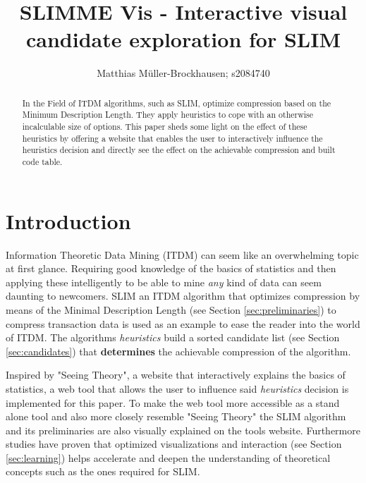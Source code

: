\documentclass[runningheads]{llncs}
\begin{document}
%


\title{SLIMME Vis - Interactive visual candidate exploration for SLIM}
%
%
\author{Matthias Müller-Brockhausen; s2084740}
%
%
%
\maketitle              %
%
\begin{abstract}
In the Field of ITDM algorithms, such as SLIM, optimize compression based on the Minimum Description Length. They apply heuristics to cope with an otherwise incalculable size of options. This paper sheds some light on the effect of these heuristics by offering a website that enables the user to interactively influence the heuristics decision and directly see the effect on the achievable compression and built code table.

\end{abstract}
%
%
%
\section{Introduction}
Information Theoretic Data Mining (ITDM) can seem like an overwhelming topic at first glance. Requiring good knowledge of the basics of statistics and then applying these intelligently to be able to mine \emph{any} kind of data can seem daunting to newcomers.
SLIM\cite{slim}  an ITDM  algorithm that optimizes compression by means of the Minimal Description Length (see Section \ref{sec:preliminaries}) to compress transaction data is used as an example to ease the reader into the world of ITDM.
The algorithms \emph{heuristics} build a sorted candidate list  (see Section \ref{sec:candidates}) that \textbf{determines} the achievable compression of the algorithm.

Inspired by "Seeing Theory"\cite{seeingtheory}, a website that interactively explains the basics of statistics, a web tool that allows the user to influence said \emph{heuristics} decision is implemented for this paper. To make the web tool more accessible as a stand alone tool and also more closely resemble "Seeing Theory" the SLIM algorithm and its preliminaries are also visually explained on the tools website. Furthermore studies have proven that optimized visualizations and interaction (see Section \ref{sec:learning}) helps accelerate and deepen the understanding of theoretical concepts\cite{learningvis} such as the ones required for SLIM. 
\end{document}
